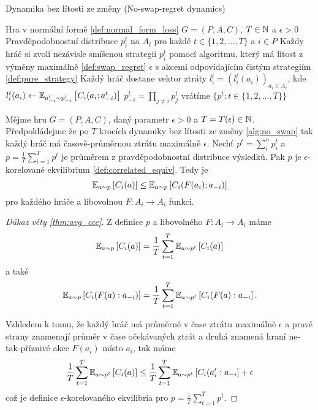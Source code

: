 \begin{algorithm}
    \algrenewcommand{}
    \algrenewcommand{}
    \caption{Dynamika bez lítosti ze změny (No-swap-regret dynamics)}
    \label{alg:no_swap}
    \begin{algorithmic}[1]
        \Require Hra v normální formě \ref{def:normal_form_loss} $G= (P,A,C)$, $T\in \N$ a $\epsilon >0$
        \Ensure Pravděpodobnostní distribuce $p^t_i$ na $A_i$ pro každé $t \in \{1,2,\dots, T\}$ a $i \in P$ 
            \State Každy hráč si zvolí nezávisle smíšenou strategii $p^t_i$ pomocí algoritmu, který má lítost z výměny maximálně \ref{def:swap_regret} $\epsilon$ s akcemi odpovídajícím čistým strategiím \ref{def:pure_strategy}
            \State Každý hráč dostane vektor ztráty $l^t_i = (l_i^t(a_i))_{a_i \in A_i}$, kde $l^t_i(a_i) \leftarrow \E[a_{-i}^t \sim p_{-i}^t]{C_i(a_i;a^t_{-i})}$
            \State $p^t_{-i} = \prod_{j \neq i} p_j^t$
        \EndFor
        \State vrátíme $\{p^t: t\in \{1,2,\dots,T\}\}$
    \end{algorithmic}
\end{algorithm}

\begin{theorem}\label{thm:avg_cce}
Mějme hru $G=(P,A,C)$, daný parametr $\epsilon > 0$ a $T = T(\epsilon) \in \N$. Předpokládejme že po $T$ krocích dynamiky bez lítosti ze změny \ref{alg:no_swap} tak každý hráč má časově-průměrnou ztrátu maximálně $\epsilon$. 
Nechť $p^t =\sum_i^n p^t_i$ a $p = \frac{1}{T} \sum^T_{i=1} p^t$ je průměrem z pravděpodobnostní distribuce výsledků. Pak $p$ je $\epsilon$-korelované ekvilibrium \ref{def:correlated_equiv}. Tedy je  
\[
    \E[a \sim p]{C_i(a)} \leq \E[a\sim p]{C_i(F(a_i);a_{-i})}
\]
pro každého hráče a libovolnou $F: A_i \rightarrow A_i$ funkci.
\end{theorem}
\begin{proof}[Důkaz věty \ref{thm:avg_cce}]
    Z definice $p$ a libovolného $F: A_i \rightarrow A_i$ máme 
    \[
        \E[a \sim p]{C_i(a)} = \frac{1}{T} \sum^T_{t=1} \E[a\sim p^t]{C_i(a)}
    \]
    a také
    \[
        \E[a \sim p]{C_i(F(a):a_{-i})} = \frac{1}{T} \sum^T_{t=1} \E[a\sim p^t]{C_i(F(a):a_{-i}}.
    \]

    Vzhledem k tomu, že každý hráč má průměrně v čase ztrátu maximálně $\epsilon$ a pravé strany znamenají průměr v čase očekávaných ztrát a druhá znamená hraní ne-tak-příznivé akce $F(a_i)$ místo $a_i$, tak máme
    \[
         \frac{1}{T} \sum^T_{t=1} \E[a\sim p^t]{C_i(a)} \leq \frac{1}{T} \sum^T_{t=1} \E[a\sim p^t]{C_i(a_i':a_{-i}} + \epsilon  
    \]
    což je definice $\epsilon$-korelovaného ekvilibria pro $p = \frac{1}{T} \sum^T_{t=1} p^t$. 
\end{proof}

